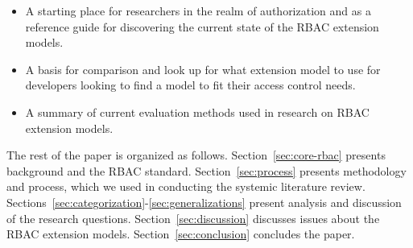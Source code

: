 \begin{itemize}
\setlength{\itemsep}{0.25pt}
\item A starting place for researchers in the realm of authorization and as a reference guide for discovering the current state of the RBAC extension models. 
\item A basis for comparison and look up for what extension model to use for developers looking to find a model to fit their access control needs.
\item A summary of current evaluation methods used in research on RBAC extension models.
\end{itemize}

The rest of the paper is organized as follows. 
Section~\ref{sec:core-rbac} presents background and the RBAC standard. 
Section~\ref{sec:process} presents methodology and process, which we used in conducting the systemic literature review. 
Sections~\ref{sec:categorization}-\ref{sec:generalizations} present analysis and discussion of the research questions. 
Section~\ref{sec:discussion} discusses issues about the RBAC extension models.
Section~\ref{sec:conclusion} concludes the paper.
